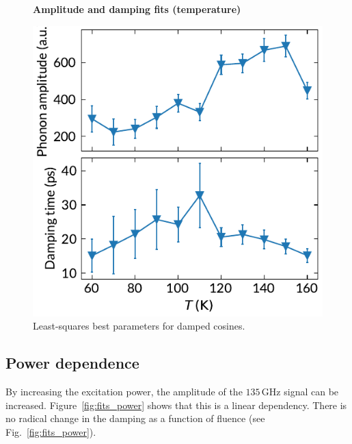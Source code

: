 \documentclass[nobib]{tufte-handout}
\begin{document}
\begin{figure}
	\centering
	\textbf{Amplitude and damping fits (temperature)}\par\medskip
	\includegraphics[width=\linewidth]{Graphics/amp_damp_temp.pdf}
	\caption{Least-squares best parameters for damped cosines.}
	\label{fig:fits_temp}
\end{figure}

\subsection{Power dependence}
By increasing the excitation power, the amplitude of the \( 135\,\mathrm{GHz} \) signal can be increased. Figure~\ref{fig:fits_power} shows that this is a linear dependency. There is no radical change in the damping as a function of fluence (see Fig.~\ref{fig:fits_power}). 
\end{document}
